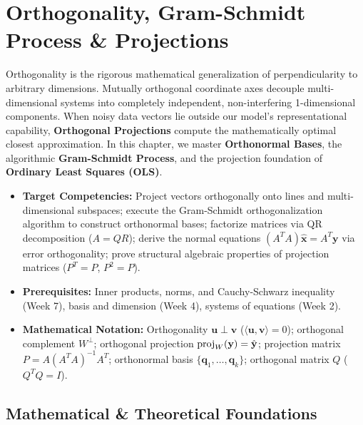 \chapter{Orthogonality, Gram-Schmidt Process \& Projections}

Orthogonality is the rigorous mathematical generalization of perpendicularity to arbitrary dimensions. Mutually orthogonal coordinate axes decouple multi-dimensional systems into completely independent, non-interfering 1-dimensional components. When noisy data vectors lie outside our model's representational capability, \textbf{Orthogonal Projections} compute the mathematically optimal closest approximation. In this chapter, we master \textbf{Orthonormal Bases}, the algorithmic \textbf{Gram-Schmidt Process}, and the projection foundation of \textbf{Ordinary Least Squares (OLS)}.

\vspace{0.5cm}
\begin{tcolorbox}[colback=primarylight, colframe=primarydark, title={\textbf{Executive Roadmap \& Learning Objectives}}]
\begin{itemize}
    \item \textbf{Target Competencies:} Project vectors orthogonally onto lines and multi-dimensional subspaces; execute the Gram-Schmidt orthogonalization algorithm to construct orthonormal bases; factorize matrices via QR decomposition ($A = QR$); derive the normal equations $(A^T A)\hat{\mathbf{x}} = A^T \mathbf{y}$ via error orthogonality; prove structural algebraic properties of projection matrices ($P^T = P$, $P^2 = P$).
    \item \textbf{Prerequisites:} Inner products, norms, and Cauchy-Schwarz inequality (Week 7), basis and dimension (Week 4), systems of equations (Week 2).
    \item \textbf{Mathematical Notation:} Orthogonality $\mathbf{u} \perp \mathbf{v}$ ($\langle \mathbf{u}, \mathbf{v} \rangle = 0$); orthogonal complement $W^\perp$; orthogonal projection $\operatorname{proj}_W(\mathbf{y}) = \hat{\mathbf{y}}$; projection matrix $P = A(A^T A)^{-1} A^T$; orthonormal basis $\{\mathbf{q}_1, \dots, \mathbf{q}_k\}$; orthogonal matrix $Q$ ($Q^T Q = I$).
\end{itemize}
\end{tcolorbox}

\section{Mathematical \& Theoretical Foundations}

